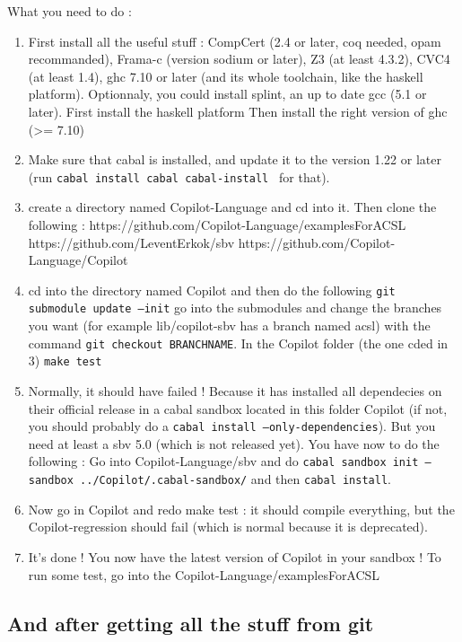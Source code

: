 \documentclass[11pt]{article}
\begin{document}
What you need to do : 
\begin{enumerate}
	\item First install all the useful stuff : CompCert (2.4 or later, coq needed, opam recommanded), Frama-c (version sodium or later), Z3 (at least 4.3.2), CVC4 (at least 1.4), ghc 7.10 or later (and its whole toolchain, like the haskell platform).
	\subitem Optionnaly, you could install splint, an up to date gcc (5.1 or later). 
	\subitem First install the haskell platform
	\subitem Then install the right version of ghc (>= 7.10)
	\item Make sure that cabal is installed, and update it to the version 1.22 or later (run \texttt{cabal install cabal cabal-install } for that). 
	\item create a directory named Copilot-Language and cd into it. Then clone the following :
	\subitem https://github.com/Copilot-Language/examplesForACSL
	\subitem https://github.com/LeventErkok/sbv
	\subitem https://github.com/Copilot-Language/Copilot
	\item cd into the directory named Copilot and then do the following
	\subitem \texttt{git submodule update --init}
	\subitem go into the submodules and change the branches you want (for example lib/copilot-sbv has a branch named acsl) with the command \texttt{git checkout BRANCHNAME}. 
	\subitem In the Copilot folder (the one cded in 3) \texttt{make test}
	\item Normally, it should have failed ! Because it has installed all dependecies on their official release in a cabal sandbox located in this folder Copilot (if not, you should probably do a \texttt{cabal install --only-dependencies}). But you need at least a sbv 5.0 (which is not released yet). You have now to do the following :
	\subitem Go into Copilot-Language/sbv and do \texttt{cabal sandbox init --sandbox ../Copilot/.cabal-sandbox/} and then \texttt{cabal install}.
	\item Now go in Copilot and redo make test : it should compile everything, but the Copilot-regression should fail (which is normal because it is deprecated).
	\item It's done ! You now have the latest version of Copilot in your sandbox ! To run some test, go into the Copilot-Language/examplesForACSL
\end{enumerate}

\subsection{And after getting all the stuff from git}
\end{document}
